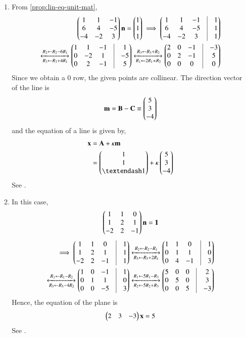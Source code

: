 \begin{enumerate}
	\item From 
		\eqref{prop:lin-eq-unit-mat},
\begin{align*}
\myvec{1&1&-1\\ 6&4&-5\\ -4&-2&3} \vec{n} = \myvec{1\\1\\1}
	\implies \myvec{1&1&-1&\vrule&1\\6&4&-5&\vrule&1\\-4&-2&3&\vrule&1}
	\\
\xleftrightarrow[R_3 \leftarrow R_3 + 4R_1]{R_2 \leftarrow R_2 - 6R_1}
\myvec{1&1&-1&\vrule&1\\0&-2&1&\vrule&-5\\0&2&-1&\vrule&5}
\xleftrightarrow[{R_1 \leftarrow 2R_1 + R_2}] {R_3 \leftarrow R_3 + R_2}
\myvec{2&0&-1&\vrule&-3\\0&2&-1&\vrule&5\\0&0&0&\vrule&0}
\end{align*}
Since we obtain a 0 row, 
the given points are collinear.
The direction vector of the line is
\begin{align}
\mathbf{m}=\mathbf{B}-\mathbf{C} \equiv \begin{pmatrix}5\\3\\-4\end{pmatrix}
\end{align}
and the equation of a line is given by,
\begin{align}
	\vec{x}&=\vec{A}+  \kappa\vec{m}\\
&= \myvec{1\\1\\– 1} + \kappa \myvec{5\\3\\-4}
\end{align}
See 
     .
     \item  In this case, 
\begin{align}
\begin{pmatrix}1&1&0 \\ 1&2&1 \\ -2&2&-1\end{pmatrix} \mathbf{n}=\mathbf{1}
\end{align}
\begin{align*}
\implies
\myvec{1&1&0&\vrule&1\\1&2&1&\vrule&1\\-2&2&-1&\vrule&1}
\xleftrightarrow[R_3 \leftarrow R_3 + 2R_1]{R_2 \leftarrow R_2 - R_1}
\myvec{1&1&0&\vrule&1\\0&1&1&\vrule&0\\0&4&-1&\vrule&3}
\\
	\xleftrightarrow[R_3 \leftarrow R_3 - 4R_2]{R_1 \leftarrow R_1- R_2}
\myvec{1&0&-1&\vrule&1\\0&1&1&\vrule&0\\0&0&-5&\vrule&3}
	\xleftrightarrow[R_2 \leftarrow 5R_2 + R_3]{R_1 \leftarrow 5R_1- R_3}
\myvec{5&0&0&\vrule&2\\0&5&0&\vrule&3\\0&0&5&\vrule&-3}
\end{align*}
Hence, the equation of the plane is
\begin{align}
\begin{pmatrix}2 & 3 & -3\end{pmatrix} \mathbf{x} = 5
\end{align}
See 
     .
\end{enumerate}
